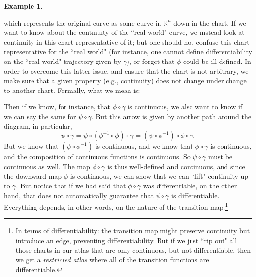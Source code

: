 \documentclass[a4paper]{book}
\theoremstyle{definition}
\newtheorem{example}{Example}[section]
\theoremstyle{definition}
\theoremstyle{definition}
\theoremstyle{theorem}
\theoremstyle{definition}
\begin{document}
\begin{example}
\begin{center}
	\end{center}  
	which represents the original curve as some curve in $\mathbb{R}^n$ down in the chart. If we want to know about the continuity of the ``real world" curve, we instead look at continuity in this chart representative of it; but one should not confuse this chart representative for the ``real world" (for instance, one cannot define differentiability on the ``real-world" trajectory given by $\gamma$), or forget that $\phi$ could be ill-defined. In order to overcome this latter issue, and ensure that the chart is not arbitrary, we make sure that a given property (e.g., continuity) does not change under change to another chart. Formally, what we mean is: 
	\begin{center} 
	\end{center} 
	Then if we know, for instance, that $\phi \circ \gamma$ is continuous, we also want to know if we can say the same for $\psi \circ \gamma$. But this arrow is given by another path around the diagram, in particular,
	\begin{equation*}
	\psi \circ \gamma = \psi \circ (\phi^{-1} \circ \phi) \circ \gamma = (\psi \circ \phi^{-1}) \circ \phi \circ \gamma. 
	\end{equation*}
	But we know that $(\psi \circ \phi^{-1})$ is continuous, and we know that $\phi \circ \gamma$ is continuous, and the composition of continuous functions is continuous. So $\psi \circ \gamma$ must be continuous as well. The map $\phi \circ \gamma$ is thus well-defined and continuous, and since the downward map $\phi$ is continuous, we can show that we can ``lift" continuity up to $\gamma$. But notice that if we had said that $\phi \circ \gamma$ was differentiable, on the other hand, that does not automatically guarantee that $\psi \circ \gamma$ is differentiable. Everything depends, in other words, on the nature of the transition map.\footnote{In terms of differentiability: the transition map might preserve continuity but introduce an edge, preventing differentiability. But if we just ``rip out" all those charts in our atlas that are only continuous, but not differentiable, then we get a \textit{restricted atlas} where all of the transition functions are differentiable.}\par 

\end{example}
\end{document}
